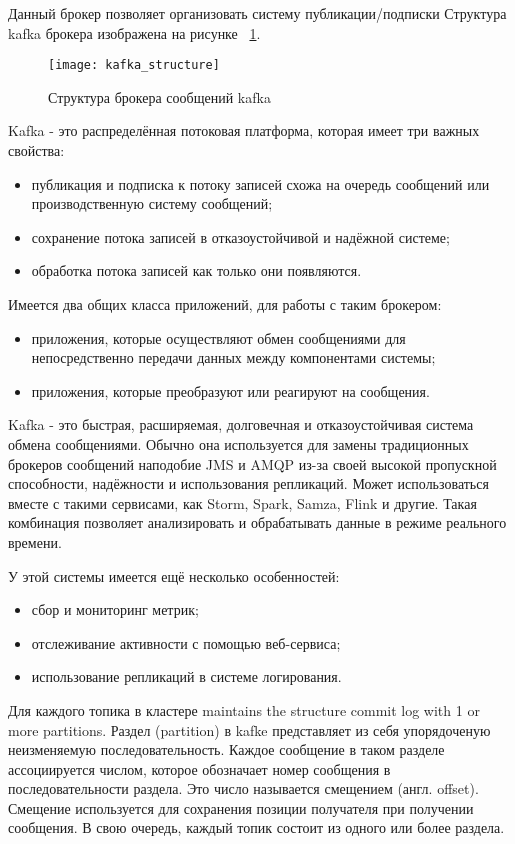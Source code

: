 Данный брокер позволяет организовать систему публикации/подписки
Структура kafka брокера изображена на рисунке ~\ref{pic:lit_review:kafka_structure}.

\begin{figure}
    \centering
    \texttt{[image: kafka\_structure]}
    \caption{Структура брокера сообщений kafka}
    \label{pic:lit_review:kafka_structure}
\end{figure}


Kafka - это распределённая потоковая платформа, которая имеет три важных свойства:
\begin{itemize}
    \item публикация и подписка к потоку записей схожа на очередь сообщений или производственную систему сообщений;
    \item сохранение потока записей в отказоустойчивой и надёжной системе;
    \item обработка потока записей как только они появляются.
\end{itemize}

Имеется два общих класса приложений, для работы с таким брокером:
\begin{itemize}
    \item приложения, которые осуществляют обмен сообщениями для непосредственно передачи данных между компонентами системы;
    \item приложения, которые преобразуют или реагируют на сообщения.
\end{itemize}

Kafka - это быстрая, расширяемая, долговечная и отказоустойчивая система обмена сообщениями.
Обычно она используется для замены традиционных брокеров сообщений наподобие JMS и AMQP из-за своей высокой пропускной способности, надёжности и использования репликаций.
Может использоваться вместе с такими сервисами, как Storm, Spark, Samza, Flink и другие.
Такая комбинация позволяет анализировать и обрабатывать данные в режиме реального времени.

У этой системы имеется ещё несколько особенностей:
\begin{itemize}
    \item сбор и мониторинг метрик;
    \item отслеживание активности с помощью веб-сервиса;
    \item использование репликаций в системе логирования.
\end{itemize}

Для каждого топика в кластере  maintains the structure commit log with 1 or more partitions.
Раздел (partition) в kafke представляет из себя упорядоченую неизменяемую последовательность.
Каждое сообщение в таком разделе ассоциируется числом, которое обозначает номер сообщения в последовательности раздела.
Это число называется смещением (англ. offset).
Смещение используется для сохранения позиции получателя при получении сообщения.
В свою очередь, каждый топик состоит из одного или более раздела.


